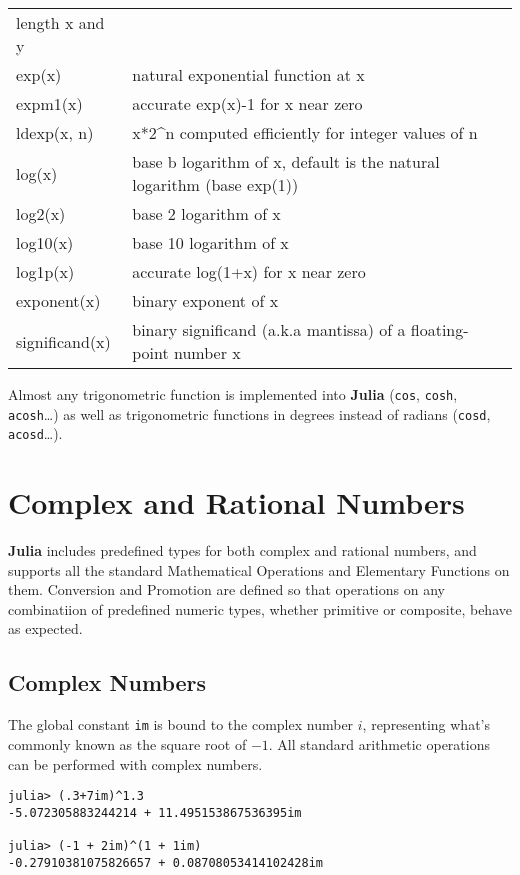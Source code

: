 \documentclass[
]{article}
\begin{document}
\begin{longtable}[]{@{}
  >{\raggedright\arraybackslash}p{}
  >{\centering\arraybackslash}p{}@{}}
length x and y \\
exp(x) & natural exponential function at x \\
expm1(x) & accurate exp(x)-1 for x near zero \\
ldexp(x, n) & x*2\^{}n computed efficiently for integer values of n \\
log(x) & base b logarithm of x, default is the natural logarithm (base
exp(1)) \\
log2(x) & base 2 logarithm of x \\
log10(x) & base 10 logarithm of x \\
log1p(x) & accurate log(1+x) for x near zero \\
exponent(x) & binary exponent of x \\
significand(x) & binary significand (a.k.a mantissa) of a floating-point
number x \\
\end{longtable}

Almost any trigonometric function is implemented into \textbf{Julia}
(\texttt{cos}, \texttt{cosh}, \texttt{acosh}\ldots) as well as
trigonometric functions in degrees instead of radians (\texttt{cosd},
\texttt{acosd}\ldots).

\newpage

\hypertarget{complex-and-rational-numbers}{%
\section{Complex and Rational
Numbers}\label{complex-and-rational-numbers}}

\textbf{Julia} includes predefined types for both complex and rational
numbers, and supports all the standard Mathematical Operations and
Elementary Functions on them. Conversion and Promotion are defined so
that operations on any combinatiion of predefined numeric types, whether
primitive or composite, behave as expected.

\hypertarget{complex-numbers}{%
\subsection{Complex Numbers}\label{complex-numbers}}

The global constant \texttt{im} is bound to the complex number \(i\),
representing what's commonly known as the square root of \(-1\). All
standard arithmetic operations can be performed with complex numbers.

\begin{verbatim}
julia> (.3+7im)^1.3
-5.072305883244214 + 11.495153867536395im

julia> (-1 + 2im)^(1 + 1im)
-0.27910381075826657 + 0.08708053414102428im
\end{verbatim}
\end{document}
